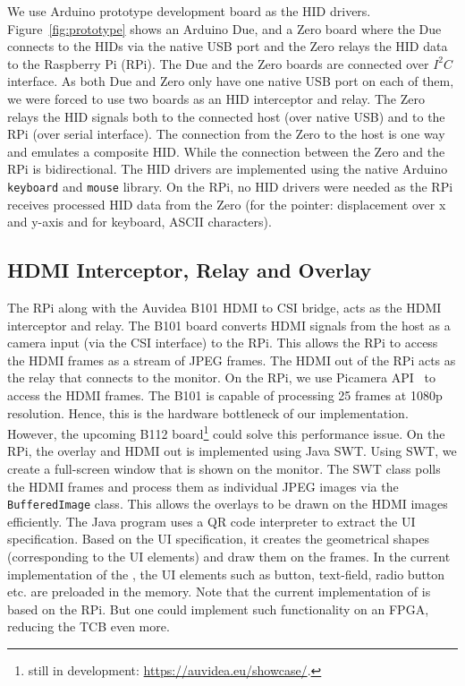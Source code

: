We use Arduino prototype development board as the HID drivers. Figure~\ref{fig:prototype} shows an Arduino Due, and a Zero board where the Due connects to the HIDs via the native USB port and the Zero relays the HID data to the Raspberry Pi (RPi). The Due and the Zero boards are connected over $I^2C$ interface. As both Due and Zero only have one native USB port on each of them, we were forced to use two boards as an HID interceptor and relay. The Zero relays the HID signals both to the connected host (over native USB) and to the RPi (over serial interface). The connection from the Zero to the host is one way and emulates a composite HID. While the connection between the Zero and the RPi is bidirectional. The HID drivers are implemented using the native Arduino \texttt{keyboard} and \texttt{mouse} library. On the RPi, no HID drivers were needed as the RPi receives processed HID data from the Zero (for the pointer: displacement over x and y-axis and for keyboard, ASCII characters).

\subsection{HDMI Interceptor, Relay and Overlay}

The RPi along with the Auvidea B101 HDMI to CSI bridge, acts as the HDMI interceptor and relay. The B101 board converts HDMI signals from the host as a camera input (via the CSI interface) to the RPi. This allows the RPi to access the HDMI frames as a stream of JPEG frames. The HDMI out of the RPi acts as the relay that connects to the monitor. On the RPi, we use Picamera API~\cite{picamera} to access the HDMI frames. The B101 is capable of processing 25 frames at 1080p resolution. Hence, this is the hardware bottleneck of our implementation. However, the upcoming B112 board\footnote{still in development: \url{https://auvidea.eu/showcase/}.} could solve this performance issue.
On the RPi, the overlay and HDMI out is implemented using Java SWT. Using SWT, we create a full-screen window that is shown on the monitor. The SWT class polls the HDMI frames and process them as individual JPEG images via the \texttt{BufferedImage} class. This allows the overlays to be drawn on the HDMI images efficiently. The Java program uses a QR code interpreter to extract the UI specification. Based on the UI specification, it creates the geometrical shapes (corresponding to the UI elements) and draw them on the frames. In the current implementation of the \name, the UI elements such as button, text-field, radio button etc. are preloaded in the \device memory. Note that the current implementation of \device is based on the RPi. But one could implement such functionality on an FPGA, reducing the TCB even more. 


